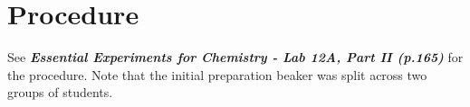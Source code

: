 
\section{Procedure}
See \textit{\textbf{Essential Experiments for Chemistry - Lab 12A, Part II (p.165)}} for the procedure. Note that the initial preparation beaker was split across two groups of students.
